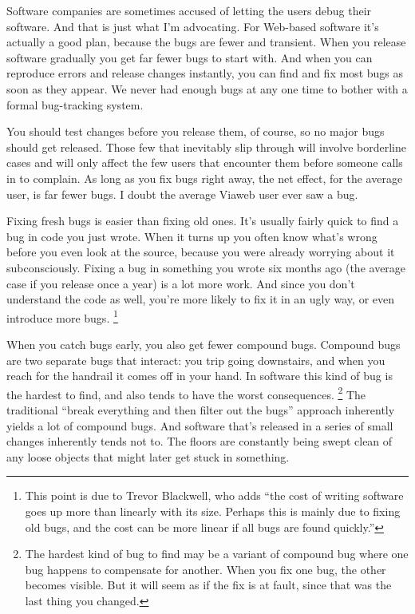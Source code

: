 \documentclass[12pt]{book}
\begin{document}
Software companies are sometimes accused of letting the users debug
their software. And that is just what I'm advocating. For Web-based
software it's actually a good plan, because the bugs are fewer and
transient. When you release software gradually you get far fewer bugs to
start with. And when you can reproduce errors and release changes
instantly, you can find and fix most bugs as soon as they appear. We
never had enough bugs at any one time to bother with a formal
bug-tracking system.

You should test changes before you release them, of course, so no major
bugs should get released. Those few that inevitably slip through will
involve borderline cases and will only affect the few users that
encounter them before someone calls in to complain. As long as you fix
bugs right away, the net effect, for the average user, is far fewer
bugs. I doubt the average Viaweb user ever saw a bug.

Fixing fresh bugs is easier than fixing old ones. It's usually fairly
quick to find a bug in code you just wrote. When it turns up you often
know what's wrong before you even look at the source, because you were
already worrying about it subconsciously. Fixing a bug in something you
wrote six months ago (the average case if you release once a year) is a
lot more work. And since you don't understand the code as well, you're
more likely to fix it in an ugly way, or even introduce more bugs.
\footnote{This point is due to Trevor Blackwell, who adds ``the cost of
writing software goes up more than linearly with its size. Perhaps this
is mainly due to fixing old bugs, and the cost can be more linear if all
bugs are found quickly.''}

When you catch bugs early, you also get fewer compound bugs. Compound
bugs are two separate bugs that interact: you trip going downstairs, and
when you reach for the handrail it comes off in your hand. In software
this kind of bug is the hardest to find, and also tends to have the
worst consequences. \footnote{The hardest kind of bug to find may be a variant of compound bug
where one bug happens to compensate for another. When you fix one bug,
the other becomes visible. But it will seem as if the fix is at fault,
since that was the last thing you changed.} The traditional ``break everything and then
filter out the bugs'' approach inherently yields a lot of compound bugs.
And software that's released in a series of small changes inherently
tends not to. The floors are constantly being swept clean of any loose
objects that might later get stuck in something.
\end{document}
